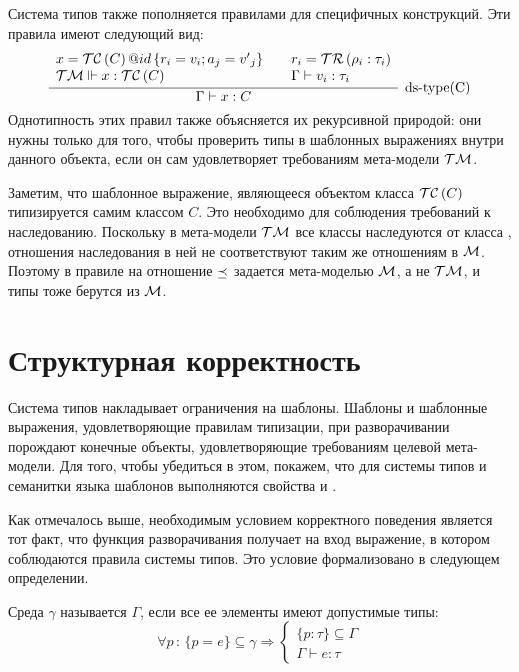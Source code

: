 Система типов также пополняется правилами для специфичных конструкций. Эти правила имеют следующий вид:
$$
\infer[\mbox{ds-type(C)}]{
	\Gamma \vdash x : C
}{
	\begin{array}{l}
	x = \obj{\TC{C}}{id}{r_i = v_i; a_j = {v'}_j}\\
	\TM \Vdash x : \TC{C} 
	\end{array}	
	&
	\begin{array}{l}
	r_i = \TR{\rho_i : \tau_i}\\
	\Gamma \vdash v_i : \tau_i\\
	\end{array}	
}
$$ 
Однотипность этих правил также объясняется их рекурсивной природой: они нужны только для того, чтобы проверить типы в шаблонных выражениях внутри данного объекта, если он сам удовлетворяет требованиям мета-модели $\mathcal{TM}$.

Заметим, что шаблонное выражение, являющееся объектом класса $\mathcal{TC}\left(C\right)$ типизируется самим классом $C$. Это необходимо для соблюдения требований к наследованию. Поскольку в мета-модели $\mathcal{TM}$ все классы наследуются от класса , отношения наследования в ней не соответствуют таким же отношениям в $\mathcal{M}$. Поэтому в правиле  на  отношение $\preceq$ задается мета-моделью $\mathcal{M}$, а не $\mathcal{TM}$, и типы тоже берутся из $\mathcal{M}$. 

\section{Структурная корректность}

Система типов накладывает ограничения на шаблоны. Шаблоны и шаблонные выражения, удовлетворяющие правилам типизации, при разворачивании порождают конечные объекты, удовлетворяющие требованиям целевой мета-модели.
Для того, чтобы убедиться в этом, покажем, что для системы типов и семанитки языка шаблонов выполняются свойства  и  \cite{???}. 

Как отмечалось выше, необходимым условием корректного поведения является тот факт, что функция разворачивания получает на вход выражение, в котором соблюдаются правила системы типов. Это условие формализовано в следующем определении.

\begin{Def}\label{agree}
Среда $\gamma$ называется  $\Gamma$, если все ее элементы имеют допустимые типы:
$$
	\forall p \, : \, 
		\{p = e\} \subseteq \gamma 
			\Rightarrow 
		\left\{\begin{array}{l}		
		\{p : \tau\} \subseteq \Gamma \\
		\Gamma \vdash e : \tau
		\end{array}\right.
$$
\end{Def}

